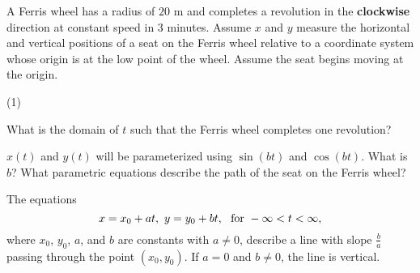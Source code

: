 \documentclass[../mathNotesPreamble]{subfiles}
\begin{document}
  \begin{ex*}[\textcolor{blue}{LC 32.3-32.4}]
    A Ferris wheel has a radius of $20$ m and completes a revolution in the \textbf{clockwise} direction at constant speed in $3$ minutes.  Assume $x$ and $y$ measure the horizontal and vertical positions of a seat on the Ferris wheel relative to a coordinate system whose origin is at the low point of the wheel.  Assume the seat begins moving at the origin.
  \end{ex*}
  \begin{flushright}
  \end{flushright}
  \vspace*{-1.5\baselineskip}
  \begin{tasks}[after-item-skip=\stretch{1}, label=,item-indent=0pt](1)
    \task \parbox{0.7\linewidth}{What is the domain of $t$ such that the Ferris wheel completes one revolution?}
    \task $x(t)$ and $y(t)$ will be parameterized using $\sin(bt)$ and $\cos(bt)$. What is $b$?
    \task What parametric equations describe the path of the seat on the Ferris wheel?
  \end{tasks}
  \pagebreak

  \begin{thmBox*}
    The equations
      \[x=x_0+at,\ y=y_0+bt,\ \textnormal{ for } -\infty<t<\infty,\]
    where $x_0$, $y_0$, $a$, and $b$ are constants with $a\neq 0$, describe a line with slope $\frac{b}{a}$ passing through the point $(x_0,y_0)$. If $a=0$ and $b\neq0$, the line is vertical.
  \end{thmBox*}
\end{document}
